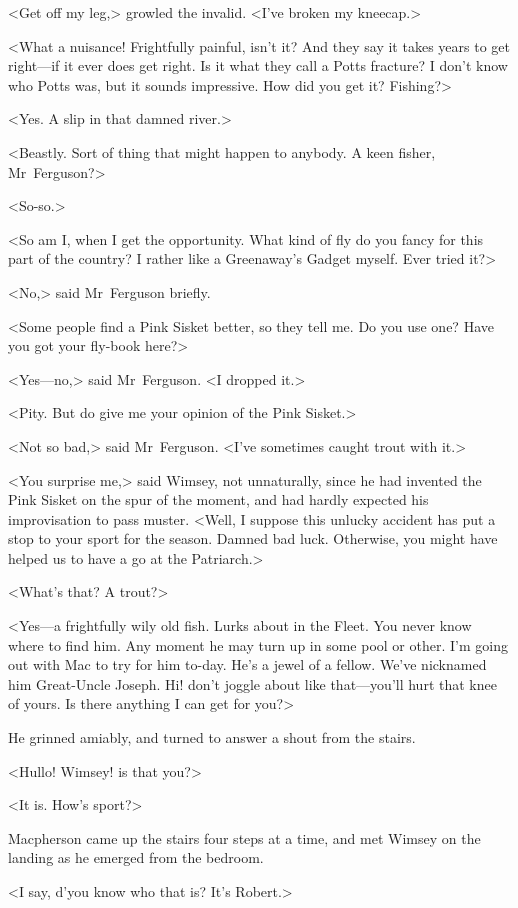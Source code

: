 <Get off my leg,> growled the invalid. <I've broken my kneecap.>

<What a nuisance! Frightfully painful, isn't it? And they say it takes years to get right—if it ever does get right. Is it what they call a Potts fracture? I don't know who Potts was, but it sounds impressive. How did you get it? Fishing?>

<Yes. A slip in that damned river.>

<Beastly. Sort of thing that might happen to anybody. A keen fisher, Mr~Ferguson?>

<So-so.>

<So am I, when I get the opportunity. What kind of fly do you fancy for this part of the country? I rather like a Greenaway's Gadget myself. Ever tried it?>

<No,> said Mr~Ferguson briefly.

<Some people find a Pink Sisket better, so they tell me. Do you use one? Have you got your fly-book here?>

<Yes—no,> said Mr~Ferguson. <I dropped it.>

<Pity. But do give me your opinion of the Pink Sisket.>

<Not so bad,> said Mr~Ferguson. <I've sometimes caught trout with it.>

<You surprise me,> said Wimsey, not unnaturally, since he had invented the Pink Sisket on the spur of the moment, and had hardly expected his improvisation to pass muster. <Well, I suppose this unlucky accident has put a stop to your sport for the season. Damned bad luck. Otherwise, you might have helped us to have a go at the Patriarch.>

<What's that? A trout?>

<Yes—a frightfully wily old fish. Lurks about in the Fleet. You never know where to find him. Any moment he may turn up in some pool or other. I'm going out with Mac to try for him to-day. He's a jewel of a fellow. We've nicknamed him Great-Uncle Joseph. Hi! don't joggle about like that—you'll hurt that knee of yours. Is there anything I can get for you?>

He grinned amiably, and turned to answer a shout from the stairs.

<Hullo! Wimsey! is that you?>

<It is. How's sport?>

Macpherson came up the stairs four steps at a time, and met Wimsey on the landing as he emerged from the bedroom.

<I say, d'you know who that is? It's Robert.>

